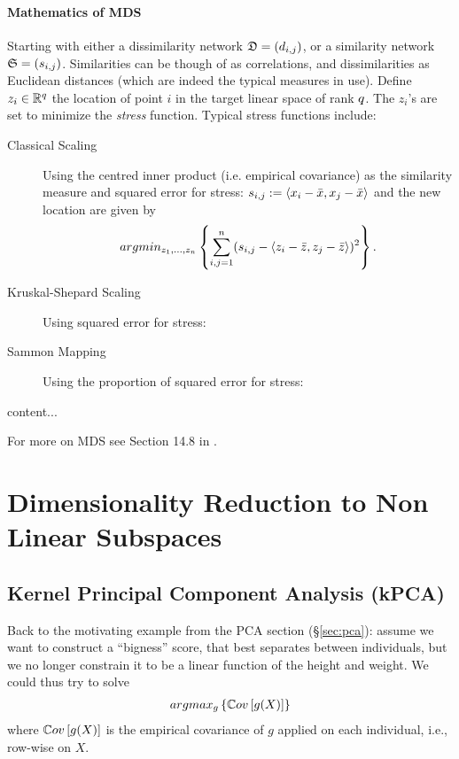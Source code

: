 \paragraph{Mathematics of MDS}
Starting with either a dissimilarity network $\mathfrak{D}=(d_{i,j})$, or a similarity network $\mathfrak{S}=(s_{i,j})$.
Similarities can be though of as correlations, and dissimilarities as Euclidean distances (which are indeed the typical measures in use).
Define $z_i \in \mathbb{R}^q$ the location of point $i$ in the target linear space of rank $q$. 
The $z_i$'s are set to minimize the \emph{stress} function.
Typical stress functions include:
\begin{description}
\item[Classical Scaling] Using the centred inner product (i.e. empirical covariance) as the similarity measure and squared error for stress:
$s_{i,j}:= \left< x_i-\bar x,x_j-\bar{x} \right>$ and the new location are given by
\begin{align}
\label{eq:stress_classical}
	 argmin_{z_1,\dots,z_n}\left\{ \sum_{i,j=1}^{n} (s_{i,j}-\left< z_i-\bar z,z_j-\bar{z} \right> )^2 \right\}.
\end{align}
\item[Kruskal-Shepard Scaling] Using squared error for stress:
\item[Sammon Mapping] Using the proportion of squared error for stress:
\end{description}


\begin{remark}
content...
\end{remark}


For more on MDS see Section 14.8 in \cite{hastie_elements_2003}.


\section{Dimensionality Reduction to Non Linear Subspaces}
\label{sec:dim_reduce_nonlinear}


\subsection{Kernel Principal Component Analysis (kPCA)}
\label{sec:kpca}

Back to the motivating example from the PCA section (\S\ref{sec:pca}): assume we want to construct a ``bigness'' score, that best separates between individuals, but we no longer constrain it to be a linear function of the height and weight.
We could thus try to solve 
\begin{align}
\label{eq:kpca_wrong}
	argmax_{g}\left\{ \mathbb{C}ov \left[ g(X) \right] \right\}
\end{align}
where $\mathbb{C}ov \left[ g(X) \right]$ is the empirical covariance of $g$ applied on each individual, i.e., row-wise on $X$.

